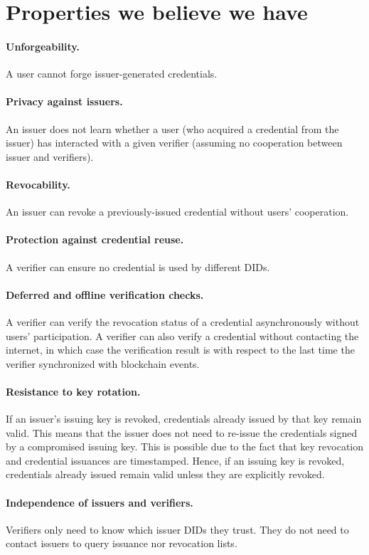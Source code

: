 \documentclass[10pt,a4paper]{article}
\begin{document}
\section{Properties we believe we have}

\paragraph{Unforgeability.} A user cannot forge issuer-generated credentials.
\paragraph{Privacy against issuers.} An issuer does not learn whether a user (who acquired a credential from the issuer) has interacted with a given verifier (assuming no cooperation between issuer and verifiers).
\paragraph{Revocability.} An issuer can revoke a previously-issued credential without users’ cooperation.
\paragraph{Protection against credential reuse.} A verifier can ensure no credential is used by different DIDs. 
\paragraph{Deferred and offline verification checks.} A verifier can verify the revocation status of a credential asynchronously without users’ participation. A verifier can also verify a credential without contacting the internet, in which case the verification result is with respect to the last time the verifier synchronized with blockchain events.
\paragraph{Resistance to key rotation.} If an issuer's issuing key is revoked, credentials already issued by that key remain valid. This means that the issuer does not need to re-issue the credentials signed by a compromised issuing key. This is possible due to the fact that key revocation and credential issuances are timestamped. Hence, if an issuing key is revoked, credentials already issued remain valid unless they are explicitly revoked.
\paragraph{Independence of issuers and verifiers.} Verifiers only need to know which issuer DIDs they trust. They do not need to contact issuers to query issuance nor revocation lists.
\end{document}
